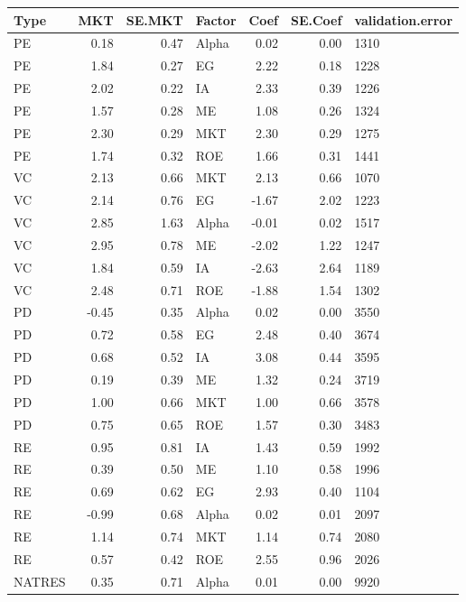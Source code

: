 \documentclass[12pt]{article}
\begin{document}
\begin{table}[ht]
	\centering
	\begin{tabular}{lrrlrrl}
		\hline
		Type & MKT & SE.MKT & Factor & Coef & SE.Coef & validation.error \\ 
		\hline
		PE & 0.18 & 0.47 & Alpha & 0.02 & 0.00 & 1310 \\ 
		PE & 1.84 & 0.27 & EG & 2.22 & 0.18 & 1228 \\ 
		PE & 2.02 & 0.22 & IA & 2.33 & 0.39 & 1226 \\ 
		PE & 1.57 & 0.28 & ME & 1.08 & 0.26 & 1324 \\ 
		PE & 2.30 & 0.29 & MKT & 2.30 & 0.29 & 1275 \\ 
		PE & 1.74 & 0.32 & ROE & 1.66 & 0.31 & 1441 \\ 
		VC & 2.13 & 0.66 & MKT & 2.13 & 0.66 & 1070 \\ 
		VC & 2.14 & 0.76 & EG & -1.67 & 2.02 & 1223 \\ 
		VC & 2.85 & 1.63 & Alpha & -0.01 & 0.02 & 1517 \\ 
		VC & 2.95 & 0.78 & ME & -2.02 & 1.22 & 1247 \\ 
		VC & 1.84 & 0.59 & IA & -2.63 & 2.64 & 1189 \\ 
		VC & 2.48 & 0.71 & ROE & -1.88 & 1.54 & 1302 \\ 
		PD & -0.45 & 0.35 & Alpha & 0.02 & 0.00 & 3550 \\ 
		PD & 0.72 & 0.58 & EG & 2.48 & 0.40 & 3674 \\ 
		PD & 0.68 & 0.52 & IA & 3.08 & 0.44 & 3595 \\ 
		PD & 0.19 & 0.39 & ME & 1.32 & 0.24 & 3719 \\ 
		PD & 1.00 & 0.66 & MKT & 1.00 & 0.66 & 3578 \\ 
		PD & 0.75 & 0.65 & ROE & 1.57 & 0.30 & 3483 \\ 
		RE & 0.95 & 0.81 & IA & 1.43 & 0.59 & 1992 \\ 
		RE & 0.39 & 0.50 & ME & 1.10 & 0.58 & 1996 \\ 
		RE & 0.69 & 0.62 & EG & 2.93 & 0.40 & 1104 \\ 
		RE & -0.99 & 0.68 & Alpha & 0.02 & 0.01 & 2097 \\ 
		RE & 1.14 & 0.74 & MKT & 1.14 & 0.74 & 2080 \\ 
		RE & 0.57 & 0.42 & ROE & 2.55 & 0.96 & 2026 \\ 
		NATRES & 0.35 & 0.71 & Alpha & 0.01 & 0.00 & 9920 \\ 

\end{tabular}
\end{table}
\end{document}
